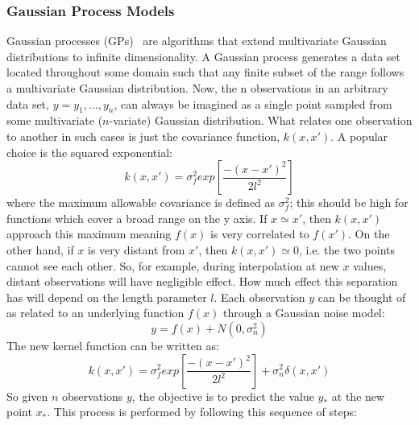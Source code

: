 \subsubsection{Gaussian Process Models}
\label{sec:GPM}
Gaussian processes (GPs)~\cite{Rasmussen_GPM} are algorithms that extend multivariate Gaussian distributions to infinite dimensionality. A Gaussian process generates a data set located throughout some domain such that any finite subset of the range follows a multivariate Gaussian distribution. Now, the n observations in an arbitrary data set, $y={y_1,\ldots,y_n}$, can always be imagined as a single point sampled from some multivariate ($n$-variate) Gaussian distribution.
What relates one observation to another in such cases is just the covariance function, $k(x,x')$. A popular choice is the squared exponential:
\begin{equation}
k(x,x')=\sigma_{f}^{2}  exp \left [ \frac{-(x-x')^2}{2 l^2} \right ]
\end{equation}
where the maximum allowable covariance is defined as $\sigma_{f}^{2}$; this should be high for functions which cover a broad range on the y axis. If $x \simeq x'$, then $k(x,x')$ approach this maximum meaning $f(x)$ is very correlated to $f(x')$. On the other hand, if $x$ is very distant from $x'$, then $k(x,x' ) \simeq 0$, i.e. the two points cannot see each other. 
So, for example, during interpolation at new $x$ values, distant observations will have negligible effect. How much effect this separation has will depend on the length parameter $l$.
Each observation $y$ can be thought of as related to an underlying function $f(x)$ through a Gaussian noise model:
\begin{equation}
y=f(x)+N(0,\sigma_{n}^{2})
\end{equation}
The new kernel function can be written as:
\begin{equation}
k(x,x')=\sigma_{f}^{2}  exp \left [ \frac{-(x-x')^2}{2 l^2} \right ] + \sigma_{n}^{2} \delta(x,x')
\end{equation}
So given $n$ observations $y$, the objective is to predict the value $y_*$ at the new point $x_*$. This process is performed by following this sequence of steps:
